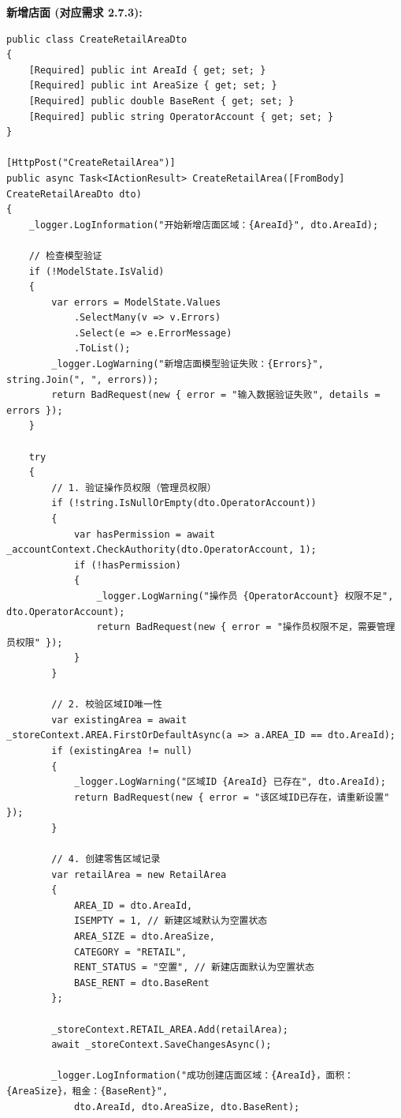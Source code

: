 \documentclass[]{article}
\begin{document}
\textbf{新增店面 (对应需求 2.7.3):}
\begin{verbatim}
public class CreateRetailAreaDto
{
    [Required] public int AreaId { get; set; }
    [Required] public int AreaSize { get; set; }
    [Required] public double BaseRent { get; set; }
    [Required] public string OperatorAccount { get; set; }
}

[HttpPost("CreateRetailArea")]
public async Task<IActionResult> CreateRetailArea([FromBody] CreateRetailAreaDto dto)
{
    _logger.LogInformation("开始新增店面区域：{AreaId}", dto.AreaId);

    // 检查模型验证
    if (!ModelState.IsValid)
    {
        var errors = ModelState.Values
            .SelectMany(v => v.Errors)
            .Select(e => e.ErrorMessage)
            .ToList();
        _logger.LogWarning("新增店面模型验证失败：{Errors}", string.Join(", ", errors));
        return BadRequest(new { error = "输入数据验证失败", details = errors });
    }

    try
    {
        // 1. 验证操作员权限（管理员权限）
        if (!string.IsNullOrEmpty(dto.OperatorAccount))
        {
            var hasPermission = await _accountContext.CheckAuthority(dto.OperatorAccount, 1);
            if (!hasPermission)
            {
                _logger.LogWarning("操作员 {OperatorAccount} 权限不足", dto.OperatorAccount);
                return BadRequest(new { error = "操作员权限不足，需要管理员权限" });
            }
        }

        // 2. 校验区域ID唯一性
        var existingArea = await _storeContext.AREA.FirstOrDefaultAsync(a => a.AREA_ID == dto.AreaId);
        if (existingArea != null)
        {
            _logger.LogWarning("区域ID {AreaId} 已存在", dto.AreaId);
            return BadRequest(new { error = "该区域ID已存在，请重新设置" });
        }

        // 4. 创建零售区域记录
        var retailArea = new RetailArea
        {
            AREA_ID = dto.AreaId,
            ISEMPTY = 1, // 新建区域默认为空置状态
            AREA_SIZE = dto.AreaSize,
            CATEGORY = "RETAIL",
            RENT_STATUS = "空置", // 新建店面默认为空置状态
            BASE_RENT = dto.BaseRent
        };

        _storeContext.RETAIL_AREA.Add(retailArea);
        await _storeContext.SaveChangesAsync();

        _logger.LogInformation("成功创建店面区域：{AreaId}，面积：{AreaSize}，租金：{BaseRent}", 
            dto.AreaId, dto.AreaSize, dto.BaseRent);


\end{verbatim}
\end{document}
